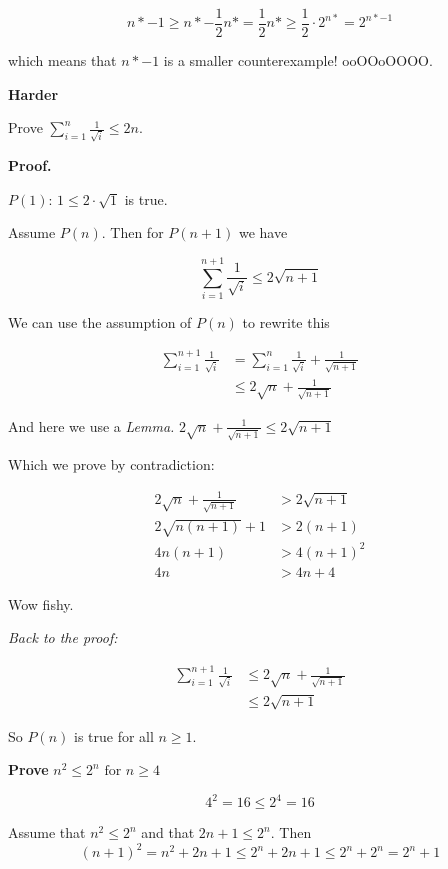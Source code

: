 \documentclass{article}
\begin{document}
$$n* - 1 \geq n* - \frac{1}{2}n* = \frac{1}{2}n* \geq \frac{1}{2} \cdot 2^{n*} = 2^{n*-1}$$

which \large means \normalsize that $n* -1$ is a \large smaller \normalsize counterexample! ooOOoOOOO.

\bigskip

\noindent \large \textbf{Harder} \normalsize

\noindent Prove $\sum_{i=1}^{n} \frac{1}{\sqrt{i}} \leq 2n$.

\noindent \textbf{Proof.}

$P(1)$: $1 \leq 2\cdot \sqrt{1}$ is true.

Assume $P(n)$. Then for $P(n+1)$ we have

$$\sum_{i=1}^{n+1} \frac{1}{\sqrt{i}} \leq 2\sqrt{n+1}$$

We can use the assumption of $P(n)$ to rewrite this

\begin{align*}
  \sum_{i=1}^{n+1} \frac{1}{\sqrt{i}} &= \sum_{i=1}^{n} \frac{1}{\sqrt{i}} + \frac{1}{\sqrt{n+1}}\\
  &\leq 2\sqrt{n} + \frac{1}{\sqrt{n+1}}
\end{align*}

And here we use a \textit{Lemma.} $2\sqrt{n} + \frac{1}{\sqrt{n+1}} \leq 2\sqrt{n+1}$

Which we prove by contradiction:

\begin{align*}
  2\sqrt{n} + \frac{1}{\sqrt{n+1}} &> 2 \sqrt{n+1} \\
  2 \sqrt{n(n+1)} + 1 &> 2(n+1) \\
  4n(n+1) &> 4(n+1)^2 \\
  4n &> 4n + 4
\end{align*}

Wow fishy.

\textit{Back to the proof:}

\begin{align*}
  \sum_{i=1}^{n+1} \frac{1}{\sqrt{i}} &\leq 2\sqrt{n} + \frac{1}{\sqrt{n+1}} \\
  &\leq 2\sqrt{n+1}
\end{align*}

So $P(n)$ is true for all $n \geq 1$.

\bigskip

\noindent \textbf{Prove} $n^2 \leq 2^n \text{ for } n \geq 4$

$$4^2 = 16 \leq 2^4 = 16$$

Assume that $n^2 \leq 2^n$ and that $2n + 1 \leq 2^n$. Then $$(n+1)^2 = n^2 + 2n + 1 \leq 2^n + 2n + 1\leq 2^n + 2^n = 2^n+1$$
\end{document}
